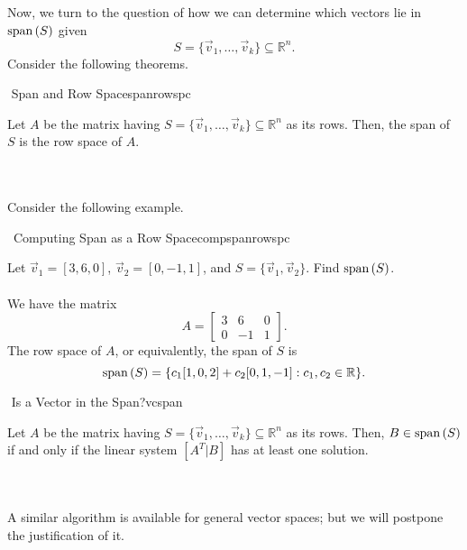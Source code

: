         \vphantom
        \\
        \\
        Now, we turn to the question of how we can determine which vectors lie in \(\text{span\,}(S)\) given
        \begin{equation*}
            S=\{\vec{v}_1,\ldots,\vec{v}_k\}\subseteq\mathbb{R}^n.
        \end{equation*}
        Consider the following theorems.
        \begin{theorem}{\Stop\,\,Span and Row Space}{spanrowspc}

            Let \(A\) be the matrix having \(S=\{\vec{v}_1,\ldots,\vec{v}_k\}\subseteq\mathbb{R}^n\) as its rows. Then, the span of \(S\) is the row space of \(A\).
            
        \end{theorem}
        \vphantom
        \\
        \\
        Consider the following example.
        \begin{example}{\Difficulty\,\Difficulty\,\,Computing Span as a Row Space}{compspanrowspc}

            Let \(\vec{v}_1=[3,6,0]\), \(\vec{v}_2=[0,-1,1]\), and \(S=\{\vec{v}_1,\vec{v}_2\}\). Find \(\text{span\,}(S)\). 
            \\
            \\
            We have the matrix
            \begin{equation*}
                A=\begin{bmatrix}
                    3 & 6 & 0 \\
                    0 & -1 & 1
                \end{bmatrix}.
            \end{equation*}
            The row space of \(A\), or equivalently, the span of \(S\) is
            \begin{equation*}
                \text{span\,}(S)=\{c_1[1,0,2]+c_2[0,1,-1]:c_1,c_2\in\mathbb{R}\}.
            \end{equation*}
            
        \end{example}
        \begin{theorem}{\Stop\,\,Is a Vector in the Span?}{vcspan}
            
            Let \(A\) be the matrix having \(S=\{\vec{v}_1,\ldots,\vec{v}_k\}\subseteq\mathbb{R}^n\) as its rows. Then, \(B\in\text{span\,}(S)\) if and only if the linear system \([A^T|B]\) has at least one solution.

        \end{theorem}
        \vphantom
        \\
        \\
        A similar algorithm is available for general vector spaces; but we will postpone the justification of it.
        

